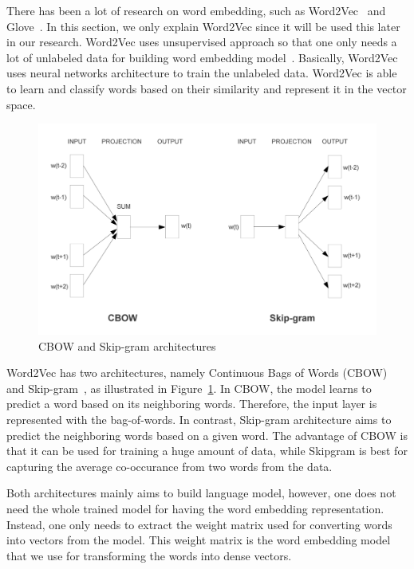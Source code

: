 There has been a lot of research on word embedding, such as Word2Vec~\citep{mikolov2014word2vec} and Glove~\citep{pennington2014glove}. In this section, we only explain Word2Vec since it will be used this later in our research. Word2Vec uses unsupervised approach so that one only needs a lot of unlabeled data for building word embedding model~\citep{mikolov2013efficient}. Basically, Word2Vec uses neural networks architecture to train the unlabeled data. Word2Vec is able to learn and classify words based on their similarity and represent it in the vector space.

\begin{figure}
	\centering
	\includegraphics[width=0.85\linewidth]{images/word2vec}
	\caption{CBOW and Skip-gram architectures~\citep{mikolov2013efficient}}
	\label{fig:word2vec}
\end{figure}

Word2Vec has two architectures, namely Continuous Bags of Words (CBOW) and Skip-gram~\citep{mikolov2013efficient}, as illustrated in Figure~\ref{fig:word2vec}. In CBOW, the model learns to predict a word based on its neighboring words. Therefore, the input layer is represented with the bag-of-words. In contrast, Skip-gram architecture aims to predict the neighboring words based on a given word. The advantage of CBOW is that it can be used for training a huge amount of data, while Skipgram is best for capturing the average co-occurance from two words from the data.

Both architectures mainly aims to build language model, however, one does not need the whole trained model for having the word embedding representation. Instead, one only needs to extract the weight matrix used for converting words into vectors from the model. This weight matrix is the word embedding model that we use for transforming the words into dense vectors.

